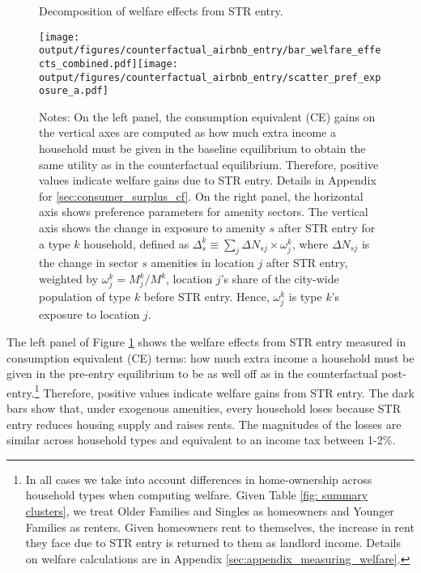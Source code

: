 \documentclass[11pt]{article}
\begin{document}
\begin{figure}[!ht]
    \centering
    \caption{Decomposition of welfare effects from STR entry.}
    \label{fig: welfare changes decomposition}
    \texttt{[image: output/figures/counterfactual\_airbnb\_entry/bar\_welfare\_effects\_combined.pdf]}\texttt{[image: output/figures/counterfactual\_airbnb\_entry/scatter\_pref\_exposure\_a.pdf]}%
    \caption*{\footnotesize Notes: On the left panel, the consumption equivalent (CE) gains on the vertical axes are computed as how much extra income a household must be given in the baseline equilibrium to obtain the same utility as in the counterfactual equilibrium. Therefore, positive values indicate welfare gains due to STR entry. Details in Appendix for \ref{sec:consumer_surplus_cf}. On the right panel, the horizontal axis shows preference parameters for amenity sectors. The vertical axis shows the change in exposure to amenity $s$ after STR entry for a type $k$ household, defined as $\Delta_s^k \equiv \sum_j \Delta N_{sj} \times \omega_j^k$, where $\Delta N_{sj}$ is the change in sector $s$ amenities in location $j$ after STR entry, weighted by $\omega_j^k = M_j^k/M^k$, location $j$'s share of the city-wide population of type $k$ before STR entry. Hence, $\omega_j^k$ is type $k$'s exposure to location $j$.}
\end{figure}
\vspace{-0.5cm}
The left panel of Figure \ref{fig: welfare changes decomposition} shows the welfare effects from STR entry measured in consumption equivalent (CE) terms: how much extra income a household must be given in the pre-entry equilibrium to be as well off as in the counterfactual post-entry.\footnote{In all cases we take into account differences in home-ownership across household types when computing welfare. Given Table \ref{fig: summary clusters}, we treat Older Families and Singles as homeowners and Younger Families as renters. Given homeowners rent to themselves, the increase in rent they face due to STR entry is returned to them as landlord income. Details on welfare calculations are in Appendix \ref{sec:appendix_measuring_welfare}.} Therefore, positive values indicate welfare gains from STR entry. The dark bars show that, under exogenous amenities, every household loses because STR entry reduces housing supply and raises rents. The magnitudes of the losses are similar across household types and equivalent to an income tax between 1-2\%.
\end{document}
